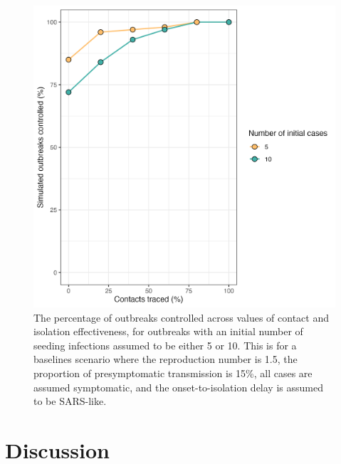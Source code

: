 \documentclass{article}
\begin{document}
\begin{figure}[h]
  \centering
  \includegraphics[width=\textwidth]{../plots/prop_outbreak_control_num_init_cases.png}
  \caption{The percentage of outbreaks controlled across values of contact and isolation effectiveness, for outbreaks with an initial number of seeding infections assumed to be either 5 or 10. This is for a baselines scenario where the reproduction number is 1.5, the proportion of presymptomatic transmission is 15\%, all cases are assumed symptomatic, and the onset-to-isolation delay is assumed to be SARS-like.}
  \label{fig:prop-outbreak-control-num-init-cases}
\end{figure}

\section{Discussion}
\end{document}
